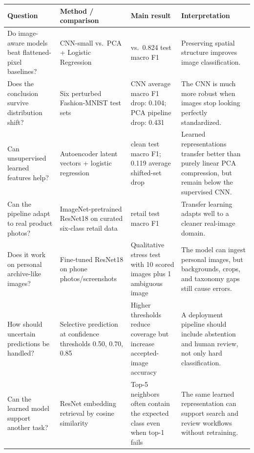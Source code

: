 \documentclass[11pt]{article}
\begin{document}
{\def\LTcaptype{table} %
\begin{longtable}[]{@{}
  >{\raggedright\arraybackslash}p{}
  >{\raggedleft\arraybackslash}p{}
  >{\raggedleft\arraybackslash}p{}
  >{\raggedright\arraybackslash}p{}@{}}
\toprule\noalign{}
\begin{minipage}[b]{\linewidth}\raggedright
Question
\end{minipage} & \begin{minipage}[b]{\linewidth}\raggedleft
Method / comparison
\end{minipage} & \begin{minipage}[b]{\linewidth}\raggedleft
Main result
\end{minipage} & \begin{minipage}[b]{\linewidth}\raggedright
Interpretation
\end{minipage} \\
\midrule\noalign{}
\endhead
\bottomrule\noalign{}
\endlastfoot
Do image-aware models beat flattened-pixel baselines? & CNN-small
vs.~PCA + Logistic Regression & 0.890 vs.~0.824 test macro F1 &
Preserving spatial structure improves image classification. \\
Does the conclusion survive distribution shift? & Six perturbed
Fashion-MNIST test sets & CNN average macro F1 drop: 0.104; PCA pipeline
drop: 0.431 & The CNN is much more robust when images stop looking
perfectly standardized. \\
Can unsupervised learned features help? & Autoencoder latent vectors +
logistic regression & 0.820 clean test macro F1; 0.119 average
shifted-set drop & Learned representations transfer better than purely
linear PCA compression, but remain below the supervised CNN. \\
Can the pipeline adapt to real product photos? & ImageNet-pretrained
ResNet18 on curated six-class retail data & 0.917 retail test macro F1 &
Transfer learning adapts well to a cleaner real-image domain. \\
Does it work on personal archive-like images? & Fine-tuned ResNet18 on
phone photos/screenshots & Qualitative stress test with 10 scored images
plus 1 ambiguous image & The model can ingest personal images, but
backgrounds, crops, and taxonomy gaps still cause errors. \\
How should uncertain predictions be handled? & Selective prediction at
confidence thresholds 0.50, 0.70, 0.85 & Higher thresholds reduce
coverage but increase accepted-image accuracy & A deployment pipeline
should include abstention and human review, not only hard
classification. \\
Can the learned model support another task? & ResNet embedding retrieval
by cosine similarity & Top-5 neighbors often contain the expected class
even when top-1 fails & The same learned representation can support
search and review workflows without retraining. \\
\end{longtable}
}
\end{document}
